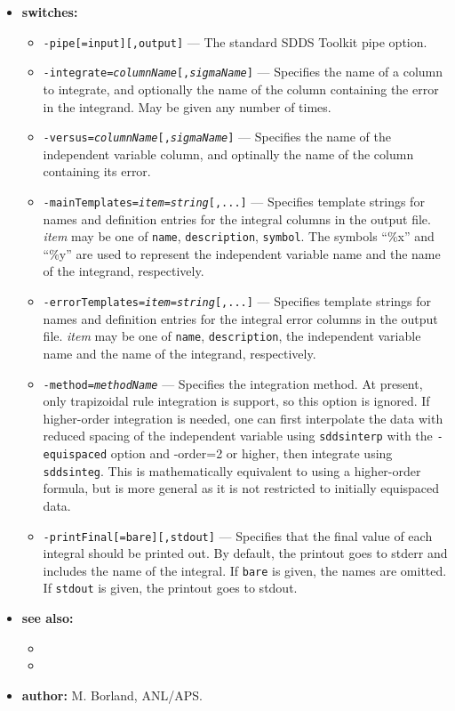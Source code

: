 \begin{itemize}
\item {\bf switches:}
    \begin{itemize}
    \item {\tt -pipe[=input][,output]} --- The standard SDDS Toolkit pipe option.
    \item {\tt -integrate={\em columnName}[,{\em sigmaName}]} --- Specifies the name
        of a column to integrate, and optionally the name of the column containing
        the error in the integrand.  May be given any number of times.
    \item {\tt -versus={\em columnName}[,{\em sigmaName}]} --- Specifies the name
        of the independent variable column, and optinally the name of the column
        containing its error.
    \item {\tt -mainTemplates={\em item}={\em string}[,...]} --- Specifies template
        strings for  names and definition entries for the integral columns
         in the output file.  {\em item} may be one of {\tt name}, {\tt description},
        {\tt symbol}.  The symbols ``\%x'' and ``\%y'' are used to represent
        the independent variable name and the name of the integrand, respectively.
    \item {\tt -errorTemplates={\em item}={\em string}[,...]} --- Specifies template
        strings for  names and definition entries for the integral error columns
        in the output file.  {\em item} may be one of {\tt name}, {\tt description},
        the independent variable name and the name of the integrand, respectively.
    \item {\tt -method={\em methodName}} --- Specifies the integration method.  At present,
        only trapizoidal rule integration is support, so this option is ignored.
        If higher-order integration is needed, one can first interpolate the data with reduced
        spacing of the independent variable using {\tt sddsinterp} with the {\tt -equispaced} option and
        {-order=2} or higher, then integrate using {\tt sddsinteg}.
        This is mathematically equivalent to using a higher-order formula, but is 
        more general as it is not restricted to initially equispaced data.
    \item {\tt -printFinal[=bare][,stdout]} --- Specifies that the final value of each
        integral should be printed out.  By default, the printout goes to stderr and
        includes the name of the integral.  If {\tt bare} is given, the names are omitted.
        If {\tt stdout} is given, the printout goes to stdout.
    \end{itemize}
\item {\bf see also:}
    \begin{itemize}
    \item {}
    \item {}
    \end{itemize}
\item {\bf author:} M. Borland, ANL/APS.
\end{itemize}

